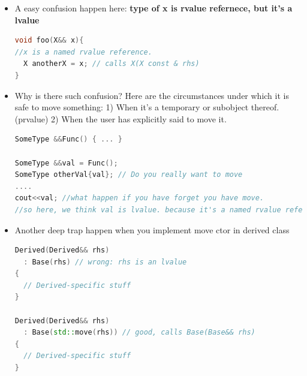 \documentclass[a4paper,12pt,twoside]{book}
\begin{document}
\begin{itemize}
\item A easy confusion happen here: \textbf{type of x is rvalue refernece, but it's a lvalue}
\begin{lstlisting}[frame=single, language=c++]
void foo(X&& x){
//x is a named rvalue reference.
  X anotherX = x; // calls X(X const & rhs)
}
\end{lstlisting}

\item Why is there such confusion? Here are the circumstances under which it is safe to move something:
1) When it's a temporary or subobject thereof. (prvalue) 2) When the user has explicitly said to move it.
\begin{lstlisting}[frame=single, language=c++]
SomeType &&Func() { ... }

SomeType &&val = Func();
SomeType otherVal{val}; // Do you really want to move 
....
cout<<val; //what happen if you have forget you have move.
//so here, we think val is lvalue. because it's a named rvalue reference.
\end{lstlisting}

\item Another deep trap happen when you implement move ctor in derived class
\begin{lstlisting}[frame=single, language=c++]
Derived(Derived&& rhs) 
  : Base(rhs) // wrong: rhs is an lvalue
{
  // Derived-specific stuff
}

Derived(Derived&& rhs) 
  : Base(std::move(rhs)) // good, calls Base(Base&& rhs)
{
  // Derived-specific stuff
}
\end{lstlisting}

\end{itemize}
\end{document}
